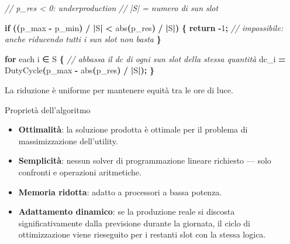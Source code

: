 \documentclass[
  italian,
  openany]{book}
\newenvironment{Shaded}{\begin{snugshade}}{\end{snugshade}}
\newcommand{\CommentTok}[1]{\textcolor[rgb]{0.56,0.35,0.01}{\textit{#1}}}
\newcommand{\ControlFlowTok}[1]{\textcolor[rgb]{0.13,0.29,0.53}{\textbf{#1}}}
\newcommand{\DecValTok}[1]{\textcolor[rgb]{0.00,0.00,0.81}{#1}}
\newcommand{\NormalTok}[1]{#1}
\newcommand{\OperatorTok}[1]{\textcolor[rgb]{0.81,0.36,0.00}{\textbf{#1}}}
\providecommand{\tightlist}{%
  \setlength{\itemsep}{0pt}\setlength{\parskip}{0pt}}
\begin{document}
\begin{Shaded}
\begin{Highlighting}[]
\CommentTok{// p\_res \textless{} 0: underproduction}
\CommentTok{// |S| = numero di sun slot}

\ControlFlowTok{if} \OperatorTok{((}\NormalTok{p\_max }\OperatorTok{{-}}\NormalTok{ p\_min}\OperatorTok{)} \OperatorTok{/} \OperatorTok{|}\NormalTok{S}\OperatorTok{|} \OperatorTok{\textless{}}\NormalTok{ abs}\OperatorTok{(}\NormalTok{p\_res}\OperatorTok{)} \OperatorTok{/} \OperatorTok{|}\NormalTok{S}\OperatorTok{|)} \OperatorTok{\{}
    \ControlFlowTok{return} \OperatorTok{{-}}\DecValTok{1}\OperatorTok{;}  \CommentTok{// impossibile: anche riducendo tutti i sun slot non basta}
\OperatorTok{\}}

\ControlFlowTok{for}\NormalTok{ each i ∈ S }\OperatorTok{\{}
    \CommentTok{// abbassa il dc di ogni sun slot della stessa quantità}
\NormalTok{    dc\_i }\OperatorTok{=}\NormalTok{ DutyCycle}\OperatorTok{(}\NormalTok{p\_max }\OperatorTok{{-}}\NormalTok{ abs}\OperatorTok{(}\NormalTok{p\_res}\OperatorTok{)} \OperatorTok{/} \OperatorTok{|}\NormalTok{S}\OperatorTok{|);}
\OperatorTok{\}}
\end{Highlighting}
\end{Shaded}

La riduzione è uniforme per mantenere equità tra le ore di luce.

\begin{callouttip}{Proprietà dell’algoritmo}

\begin{itemize}
\tightlist
\item
  \textbf{Ottimalità}: la soluzione prodotta è ottimale per il problema
  di massimizzazione dell'utility.
\item
  \textbf{Semplicità}: nessun solver di programmazione lineare richiesto
  --- solo confronti e operazioni aritmetiche.
\item
  \textbf{Memoria ridotta}: adatto a processori a bassa potenza.
\item
  \textbf{Adattamento dinamico}: se la produzione reale si discosta
  significativamente dalla previsione durante la giornata, il ciclo di
  ottimizzazione viene rieseguito per i restanti slot con la stessa
  logica.
\end{itemize}

\end{callouttip}
\end{document}
